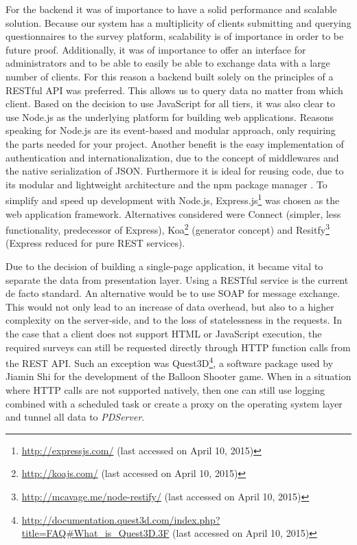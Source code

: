 		For the backend it was of importance to have a solid performance and scalable solution. Because our system has a multiplicity of clients submitting and querying questionnaires to the survey platform, scalability is of importance in order to be future proof. Additionally, it was of importance to offer an interface for administrators and to be able to easily be able to exchange data with a large number of clients. For this reason a backend built solely on the principles of a RESTful API was preferred. This allows us to query data no matter from which client.
		Based on the decision to use JavaScript for all tiers, it was also clear to use Node.js as the underlying platform for building web applications. Reasons speaking for Node.js are its event-based and modular approach, only requiring the parts needed for your project. Another benefit is the easy implementation of authentication and internationalization, due to the concept of middlewares \cite{Heise2014RESTConnect} and the native serialization of JSON. Furthermore it is ideal for reusing code, due to its modular and lightweight architecture and the npm package manager \cite{Heise2014NodeProCon, Stackoverflow2015WhenToUseNodeJS}. To simplify and speed up development with Node.js, Express.js\footnote{\url{http://expressjs.com/} (last accessed on April 10, 2015)} was chosen as the web application framework. Alternatives considered were Connect (simpler, less functionality, predecessor of Express), Koa\footnote{\url{http://koajs.com/} (last accessed on April 10, 2015)} (generator concept) and Resitfy\footnote{\url{http://mcavage.me/node-restify/} (last accessed on April 10, 2015)} (Express reduced for pure REST services). 

		Due to the decision of building a single-page application, it became vital to separate the data from presentation layer. Using a RESTful service is the current de facto standard. An alternative would be to use SOAP for message exchange. This would not only lead to an increase of data overhead, but also to a higher complexity on the server-side, and to the loss of statelessness in the requests. In the case that a client does not support HTML or JavaScript execution, the required surveys can still be requested directly through HTTP function calls from the REST API. Such an exception was Quest3D\footnote{\url{http://documentation.quest3d.com/index.php?title=FAQ\#What_is_Quest3D.3F} (last accessed on April 10, 2015)}, a software package used by Jiamin Shi for the development of the Balloon Shooter game. When in a situation where HTTP calls are not supported natively, then one can still use logging combined with a scheduled task or create a proxy on the operating system layer and tunnel all data to \textit{PDServer}.





